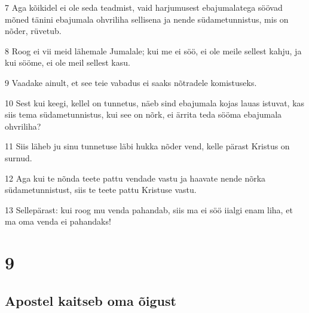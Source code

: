 \par 7 Aga kõikidel ei ole seda teadmist, vaid harjumusest ebajumalatega söövad mõned tänini ebajumala ohvriliha sellisena ja nende südametunnistus, mis on nõder, rüvetub.
\par 8 Roog ei vii meid lähemale Jumalale; kui me ei söö, ei ole meile sellest kahju, ja kui sööme, ei ole meil sellest kasu.
\par 9 Vaadake ainult, et see teie vabadus ei saaks nõtradele komistuseks.
\par 10 Sest kui keegi, kellel on tunnetus, näeb sind ebajumala kojas lauas istuvat, kas siis tema südametunnistus, kui see on nõrk, ei ärrita teda sööma ebajumala ohvriliha?
\par 11 Siis läheb ju sinu tunnetuse läbi hukka nõder vend, kelle pärast Kristus on surnud.
\par 12 Aga kui te nõnda teete pattu vendade vastu ja haavate nende nõrka südametunnistust, siis te teete pattu Kristuse vastu.
\par 13 Sellepärast: kui roog mu venda pahandab, siis ma ei söö iialgi enam liha, et ma oma venda ei pahandaks!


\chapter{9}

\section*{Apostel kaitseb oma õigust}

